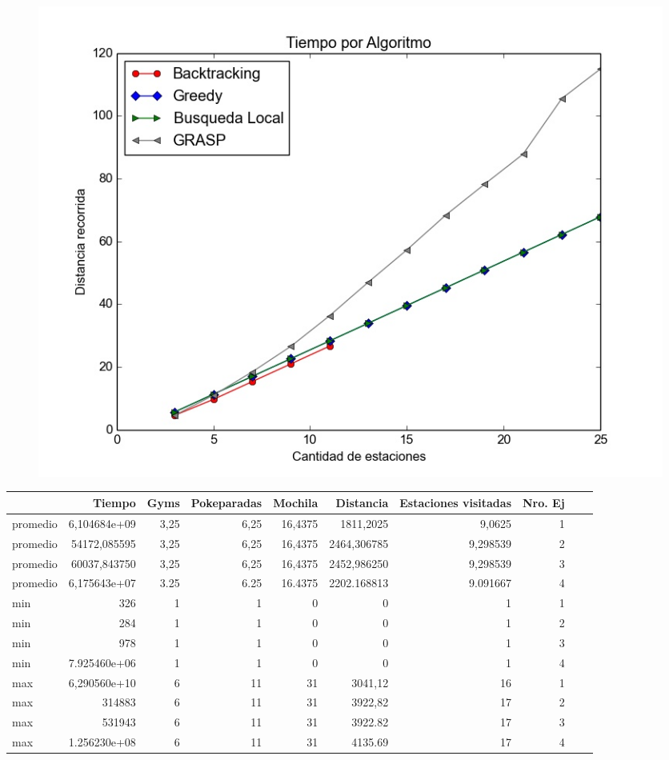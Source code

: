         \begin{figure}[H]
            \begin{center}
              \includegraphics[width=0.7\columnwidth]{imagenes/exp2_ej5_correctitud_solucion.jpeg}
              \caption{}
            \end{center}
        \end{figure}
      


\begin{tabular}{l | rrrrrrrrr}
\toprule
{} &        Tiempo &       Gyms &  Pokeparadas &     Mochila &    Distancia &  Estaciones visitadas &  Nro. Ej \\
\midrule
promedio  &  6,104684e+09 &   3,25     &    6,25     &   16,4375   &  1811,2025   &            9,0625   &      1 \\
promedio  &  54172,085595 &   3,25     &    6,25     &   16,4375   &  2464,306785 &            9,298539 &      2 \\
promedio  &  60037,843750 &   3,25     &    6,25     &   16,4375   &  2452,986250 &            9,298539 &      3 \\
promedio  &  6,175643e+07 &   3.25     &    6.25     &   16.4375   &  2202.168813 &            9.091667 &      4 \\
\hline
min   &  326          &   1        &    1        &   0         &  0           &            1        &      1 \\
min   &  284          &   1        &    1        &   0         &  0           &            1        &      2 \\
min   &  978          &   1        &    1        &   0         &  0           &            1        &      3 \\
min   &  7.925460e+06 &   1        &    1        &   0         &  0           &            1        &      4 \\
\hline
max   &  6,290560e+10 &   6        &    11       &   31        &  3041,12     &            16       &      1 \\
max   &  314883       &   6        &    11       &   31        &  3922,82     &            17       &      2 \\
max   &  531943       &   6        &    11       &   31        &  3922.82     &            17       &      3 \\
max   &  1.256230e+08 &   6        &    11       &   31        &  4135.69     &            17       &      4 \\
\bottomrule
\end{tabular}      


